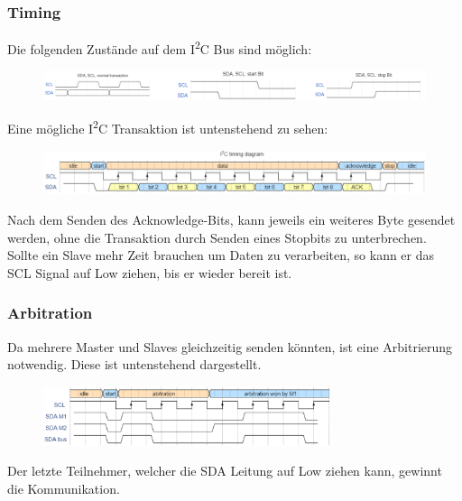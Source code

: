 \subsubsection{Timing}
Die folgenden Zustände auf dem I\textsuperscript{2}C Bus sind möglich:
\begin{figure}[H]
    \includegraphics[width=1\textwidth]{images/i2c_bitstates.png}
\end{figure}
Eine mögliche I\textsuperscript{2}C Transaktion ist untenstehend zu sehen:
\begin{figure}[H]
    \includegraphics[width=1\textwidth]{images/i2c_timing.png}
\end{figure}
Nach dem Senden des Acknowledge-Bits, kann jeweils ein weiteres Byte gesendet werden, ohne die Transaktion durch Senden eines Stopbits zu unterbrechen. \\
Sollte ein Slave mehr Zeit brauchen um Daten zu verarbeiten, so kann er das SCL Signal auf Low ziehen, bis er wieder bereit ist.

\subsubsection{Arbitration}
Da mehrere Master und Slaves gleichzeitig senden könnten, ist eine Arbitrierung notwendig. Diese ist untenstehend dargestellt.
\begin{figure}[H]
    \includegraphics[width=0.75\textwidth]{images/i2c_arbitration.png}
\end{figure}
Der letzte Teilnehmer, welcher die SDA Leitung auf Low ziehen kann, gewinnt die Kommunikation.

